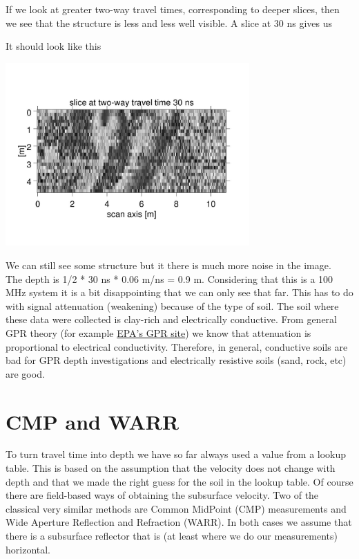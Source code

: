 \documentclass[11pt]{article}
\begin{document}
If we look at greater two-way travel times, corresponding to deeper
slices, then we see that the structure is less and less well
visible. A slice at 30 ns gives us

It should look like this
\begin{center}
\includegraphics[width=0.7\textwidth, trim = 1cm 3cm 1cm
  3cm,clip]{figures/Area30ns.jpg}
\end{center}

We can still see some structure but it there is much more noise in the
image.  \\The depth is 1/2 * 30 ns * 0.06 m/ns = 0.9 m.  Considering
that this is a 100 MHz system it is a bit disappointing that we can
only see that far. This has to do with signal attenuation (weakening)
because of the type of soil.  The soil where these data were collected
is clay-rich and electrically conductive.  From general GPR theory
(for example
\href{http://www.epa.gov/esd/cmb/GeophysicsWebsite/pages/reference/methods/Surface_Geophysical_Methods/Electromagnetic_Methods/Ground-Penetrating_Radar.htm}{EPA's
  GPR site}) we know that attenuation is proportional to electrical
conductivity. Therefore, in general, conductive soils are bad for GPR
depth investigations and electrically resistive soils (sand, rock,
etc) are good.


\section{CMP and WARR}

To turn travel time into depth we have so far always used a value from
a lookup table. This is based on the assumption that the velocity does
not change with depth and that we made the right guess for the soil in
the lookup table. Of course there are field-based ways of obtaining
the subsurface velocity. Two of the classical very similar methods are
Common MidPoint (CMP) measurements and Wide Aperture Reflection and
Refraction (WARR). In both cases we assume that there is a subsurface
reflector that is (at least where we do our measurements) horizontal.
\end{document}
